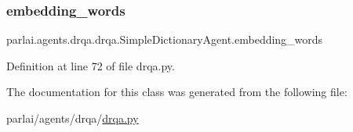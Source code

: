 \subsubsection{\texorpdfstring{embedding\+\_\+words}{embedding\_words}}
{\footnotesize\ttfamily parlai.\+agents.\+drqa.\+drqa.\+Simple\+Dictionary\+Agent.\+embedding\+\_\+words}



Definition at line 72 of file drqa.\+py.



The documentation for this class was generated from the following file\+:\begin{DoxyCompactItemize}
\item 
parlai/agents/drqa/\hyperlink{drqa_8py}{drqa.\+py}\end{DoxyCompactItemize}
